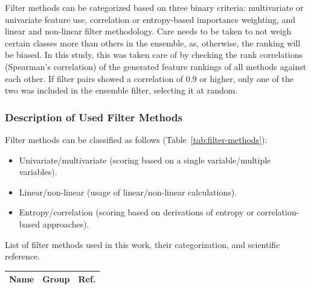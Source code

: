 \documentclass[remotesensing,article,accept,moreauthors,pdftex]{Definitions/mdpi}
\begin{document}
\begin{paracol}{2}
Filter methods can be categorized based on three binary criteria: multivariate or univariate feature use, correlation or entropy-based importance weighting, and linear and non-linear filter methodology.
Care needs to be taken to not weigh certain classes more than others in the ensemble, as, otherwise, the ranking will be biased.
In this study, this was taken care of by checking the rank correlations (Spearman's correlation) of the generated feature rankings of all methods against each other.
If filter pairs showed a correlation of 0.9 or higher, only one of the two was included in the ensemble filter, selecting it at random.

\subsubsection{Description of Used Filter Methods}

Filter methods can be classified as follows (Table~\ref{tab:filter-methods}):

\begin{itemize}
	\item Univariate/multivariate (scoring based on a single variable/multiple variables).
	\item Linear/non-linear (usage of linear/non-linear calculations).
	\item Entropy/correlation (scoring based on derivations of entropy or correlation-based approaches).
\end{itemize}
\vspace{-6pt}

\begin{specialtable}[H]
\setlength{\tabcolsep}{5.2mm}
	\caption{List of filter methods used in this work, their categorization, and scientific reference.}
	\label{tab:filter-methods}
	\begingroup\footnotesize
		\begin{tabular}{lll}
				\toprule
			\textbf{Name}                                         & \textbf{Group} & \textbf{Ref. }              \\\midrule


\end{tabular}
\end{specialtable}
\end{paracol}
\end{document}
